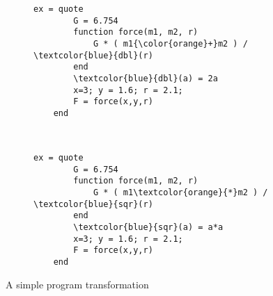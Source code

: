 \documentclass{article}
\newcommand{\Real}{\mathbb{R}}
\newcommand{\Rthree}{\Real{} \times \Real{} \times \Real{}}
\begin{document}
\begin{figure}
  \centering
\begin{subfigure}[t]{0.47\textwidth}
\begin{center}
  \begin{Verbatim}[commandchars=\\\{\}]
    ex = quote
        G = 6.754
        function force(m1, m2, r)
            G * ( m1{\color{orange}+}m2 ) / \textcolor{blue}{dbl}(r)
        end
        \textcolor{blue}{dbl}(a) = 2a
        x=3; y = 1.6; r = 2.1;
        F = force(x,y,r)
    end
  \end{Verbatim}

\end{center}
\end{subfigure}
~\hspace{1em} %
\begin{subfigure}[t]{0.47\textwidth}
  \begin{center}
  \begin{Verbatim}[commandchars=\\\{\}]
    ex = quote
        G = 6.754
        function force(m1, m2, r)
            G * ( m1\textcolor{orange}{*}m2 ) / \textcolor{blue}{sqr}(r)
        end
        \textcolor{blue}{sqr}(a) = a*a
        x=3; y = 1.6; r = 2.1;
        F = force(x,y,r)
    end
  \end{Verbatim}

\end{center}
\end{subfigure}
\caption{A simple program transformation}
\end{figure}
\end{document}
